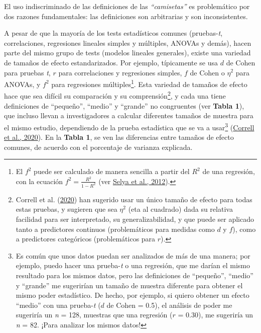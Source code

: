 \documentclass[
]{article}
\begin{document}
El uso indiscriminado de las definiciones de las \emph{``camisetas''} es
problemático por dos razones fundamentales: las definiciones son
arbitrarias y son inconsistentes.

A pesar de que la mayoría de los tests estadísticos comunes
(pruebas-\emph{t}, correlaciones, regresiones lineales simples y
múltiples, ANOVAs y demás), hacen parte del mismo grupo de tests
(modelos lineales generales), existe una variedad de tamaños de efecto
estandarizados. Por ejemplo, típicamente se usa \(d\) de Cohen para
pruebas \emph{t}, \(r\) para correlaciones y regresiones simples, \(f\)
de Cohen o \(\eta^2\) para ANOVAs, y \(f^2\) para regresiones
múltiples\footnote{El \(f^2\) puede ser calculado de manera sencilla a
  partir del \(R^2\) de una regresión, con la ecuación
  \(f^2 = \frac{R^2}{1-R^2}\) (ver
  \protect\hyperlink{ref-selyaPracticalGuideCalculating2012}{Selya et
  al., 2012}).}. Esta variedad de tamaños de efecto hace que sea difícil
su comparación y su comprensión\footnote{Correll et al.
  (\protect\hyperlink{ref-correllAvoidCohenSmall2020}{2020}) han
  sugerido usar un único tamaño de efecto para todas estas pruebas, y
  sugieren que sea \(\eta^2\) (eta al cuadrado) dada su relativa
  facilidad para ser interpretado, su generalizabilidad, y que puede ser
  aplicado tanto a predictores continuos (problemáticos para medidas
  como \(d\) y \(f\)), como a predictores categóricos (problemáticos
  para \(r\)).}, y cada una tiene definiciones de ``pequeño'', ``medio''
y ``grande'' no congruentes (ver \textbf{Tabla 1}), que incluso llevan a
investigadores a calcular diferentes tamaños de muestra para el mismo
estudio, dependiendo de la prueba estadística que se va a
usar\footnote{Es común que unos datos puedan ser analizados de más de
  una manera; por ejemplo, puedo hacer una prueba-\emph{t} o una
  regresión, que me darían el mismo resultado para los mismos datos,
  pero las definiciones de ``pequeño'', ``medio'' y ``grande'' me
  sugerirían un tamaño de muestra diferente para obtener el mismo poder
  estadístico. De hecho, por ejemplo, si quiero obtener un efecto
  ``medio'' con una prueba-\emph{t} (\(d\) de Cohen = 0.5), el análisis
  de poder me sugeriría un \emph{n} = 128, muestras que una regresión
  (\(r\) = 0.30), me sugeriría un \emph{n} = 82. ¡Para analizar los
  mismos datos!}
(\protect\hyperlink{ref-correllAvoidCohenSmall2020}{Correll et al.,
2020}). En la \textbf{Tabla 1}, se ven las diferencias entre tamaños de
efecto comunes, de acuerdo con el porcentaje de varianza explicada.
\end{document}
